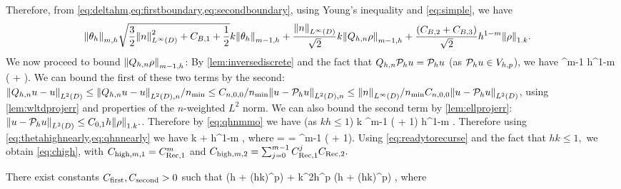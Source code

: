 Therefore, from \cref{eq:deltahm,eq:firstboundary,eq:secondboundary}, using Young's inequality and \cref{eq:simple}, we have
\begin{align}\label{eq:thetahighnearly}
\Nfn{m,h}{\thetah} &\sqrt{\frac32 \NLiD{n}^2 + \CBo + \half} k  \Nfn{m-1,h}{\thetah} + \frac{\NLiD{n}}{\sqrt{2}} k \Nfn{m-1,h}{\Qhn \rho} + \frac{\mleft(\CBt + \CBth\mright)}{\sqrt{2}} h^{1-m} \NW{\rho}.
\end{align}
We now proceed to bound $\Nfn{m-1,h}{\Qhn \rho}$: By \cref{lem:inversediscrete} and the fact that $Q_{h,n} \mathcal P_{h} u = \mathcal P_{h} u$ (as $\mathcal P_{h} u \in V_{h,p}$), we have
\beq\label{eq:qhnmmo}
 \leq \Chinv^{m-1} h^{1-m} \mleft( + \mright).
\eeq
We can bound the first of these two terms by the second: $\NLtD{\Qhn u - u} \leq \NLtDn{\Qhn u - u}/\nmin \leq \Cfn{n,0,0}/\nmin \NLtDn{u - \Ph u} \leq \NLiD{n}/\nmin \Cfn{n,0,0} \NLtD{u-\Ph u}$, using \cref{lem:wltdprojerr} and properties of the $n$-weighted $L^2$ norm. We can also bound the second term by \cref{lem:ellprojerr}: $\NLtD{u - \Ph u} \leq \Cfn{0,1} h \NW{\rho}.$. Therefore by \cref{eq:qhnmmo} we have (as $kh \leq 1$)
\beq\label{eq:qhnnearly}
k  \leq \Chinv^{m-1} \mleft(  + 1\mright)  h^{1-m} \NW{\rho}.
\eeq
Therefore using \cref{eq:thetahighnearly,eq:qhnnearly} we have
\beq\label{eq:readytorecurse}
 \leq \CReco k  + \CRect h^{1-m} \NW{\rho},
\eeq
where
\beqs
\CReco =  \tand \CRect =  \Chinv^{m-1} \mleft(  + 1\mright).
\eeqs
Using \cref{eq:readytorecurse} and the fact that $hk \leq 1,$ we obtain \cref{eq:chigh}, with $C_{\mathrm{high},m,1} = C_{\mathrm{Rec},1}^m$ and $C_{\mathrm{high},m,2} = \sum_{j=0}^{m-1} C_{\mathrm{Rec},1}^j C_{\mathrm{Rec},2}.$
\epf
{}

\label{lem:ltthetahbound}
There exist constants $C_{\mathrm{first}}, C_{\mathrm{second}} > 0$ such that
\beq\label{eq:ltthetahbound}
\NLtD{\thetah} \leq \Cfirst \mleft(\CFEMotilde h + \CFEMttilde \CAnk (hk)^p\mright) \NW{\rho} + \Csecond k^2h^p \mleft(\CFEMotilde h + \CFEMttilde \CAnk (hk)^p\mright) ,
\eeq
where
\ele

